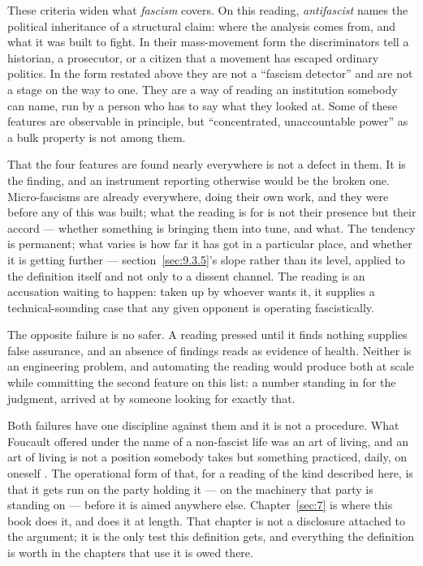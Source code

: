 These criteria widen what \textit{fascism} covers. On this reading, \textit{antifascist} names the political inheritance of a structural claim: where the analysis comes from, and what it was built to fight. In their mass-movement form the discriminators tell a historian, a prosecutor, or a citizen that a movement has escaped ordinary politics. In the form restated above they are not a “fascism detector” and are not a stage on the way to one. They are a way of reading an institution somebody can name, run by a person who has to say what they looked at. Some of these features are observable in principle, but “concentrated, unaccountable power” as a bulk property is not among them.

That the four features are found nearly everywhere is not a defect in them. It is the finding, and an instrument reporting otherwise would be the broken one. Micro-fascisms are already everywhere, doing their own work, and they were before any of this was built; what the reading is for is not their presence but their accord — whether something is bringing them into tune, and what. The tendency is permanent; what varies is how far it has got in a particular place, and whether it is getting further — section~\ref{sec:9.3.5}'s slope rather than its level, applied to the definition itself and not only to a dissent channel. The reading is an accusation waiting to happen: taken up by whoever wants it, it supplies a technical-sounding case that any given opponent is operating fascistically.

The opposite failure is no safer. A reading pressed until it finds nothing supplies false assurance, and an absence of findings reads as evidence of health. Neither is an engineering problem, and automating the reading would produce both at scale while committing the second feature on this list: a number standing in for the judgment, arrived at by someone looking for exactly that.

Both failures have one discipline against them and it is not a procedure. What Foucault offered under the name of a non-fascist life was an art of living, and an art of living is not a position somebody takes but something practiced, daily, on oneself \autocite{foucault1977preface}. The operational form of that, for a reading of the kind described here, is that it gets run on the party holding it — on the machinery that party is standing on — before it is aimed anywhere else. Chapter~\ref{sec:7} is where this book does it, and does it at length. That chapter is not a disclosure attached to the argument; it is the only test this definition gets, and everything the definition is worth in the chapters that use it is owed there.

